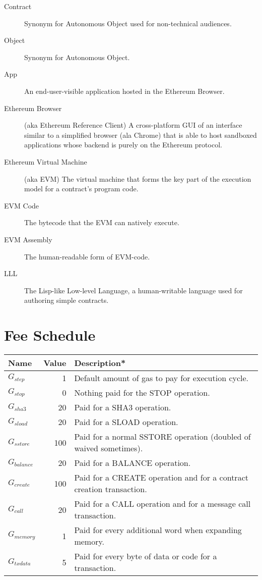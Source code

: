 \documentclass[9pt,oneside]{amsart}
\begin{document}
\begin{description}
\item[Contract] Synonym for Autonomous Object used for non-technical audiences.

\item[Object] Synonym for Autonomous Object.

\item[App] An end-user-visible application hosted in the Ethereum Browser.

\item[Ethereum Browser] (aka Ethereum Reference Client) A cross-platform GUI of an interface similar to a simplified browser (ala Chrome) that is able to host sandboxed applications whose backend is purely on the Ethereum protocol.

\item[Ethereum Virtual Machine] (aka EVM) The virtual machine that forms the key part of the execution model for a contract's program code.

\item[EVM Code] The bytecode that the EVM can natively execute.

\item[EVM Assembly] The human-readable form of EVM-code.

\item[LLL] The Lisp-like Low-level Language, a human-writable language used for authoring simple contracts.

\end{description}

\section{Fee Schedule}\label{app:fees}

\begin{tabular*}{\columnwidth}[h]{lrl}
\toprule
Name & Value & Description* \\
\midrule
$G_{step}$ & 1 & Default amount of gas to pay for execution cycle. \\
$G_{stop}$ & 0 & Nothing paid for the {\small STOP} operation. \\
$G_{sha3}$ & 20 & Paid for a {\small SHA3} operation. \\
$G_{sload}$ & 20 & Paid for a {\small SLOAD} operation. \\
$G_{sstore}$ & 100 & Paid for a normal {\small SSTORE} operation (doubled of waived sometimes). \\
$G_{balance}$ & 20 & Paid for a {\small BALANCE} operation. \\
$G_{create}$ & 100 & Paid for a {\small CREATE} operation and for a contract creation transaction. \\
$G_{call}$ & 20 & Paid for a {\small CALL} operation and for a message call transaction. \\
$G_{memory}$ & 1 & Paid for every additional word when expanding memory. \\
$G_{txdata}$ & 5 & Paid for every byte of data or code for a transaction. \\
\bottomrule
\end{tabular*}
\end{document}
